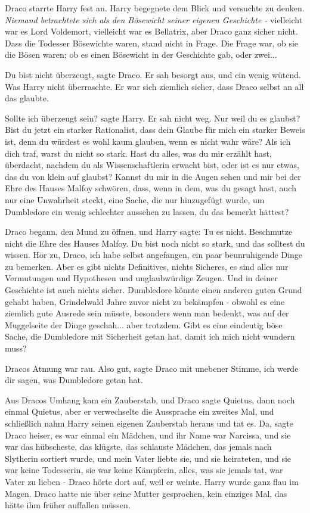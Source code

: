 Draco starrte Harry fest an. Harry begegnete dem Blick und versuchte zu denken.
\emph{Niemand betrachtete sich als den Bösewicht seiner eigenen Geschichte -}
vielleicht war es Lord Voldemort, vielleicht war es Bellatrix, aber Draco ganz
sicher nicht. Dass die Todesser Bösewichte waren, stand nicht in Frage. Die
Frage war, ob sie die Bösen waren; ob es einen Bösewicht in der Geschichte gab,
oder zwei...

\glqq{}Du bist nicht überzeugt\grqq{}, sagte Draco. Er sah besorgt aus, und ein
wenig wütend. Was Harry nicht überraschte. Er war sich ziemlich sicher, dass
Draco selbst an all das glaubte.

\glqq{}Sollte ich überzeugt sein?\grqq{} sagte Harry. Er sah nicht weg. \glqq{}Nur
weil du es glaubst? Bist du jetzt ein starker Rationalist, dass dein Glaube für
mich ein starker Beweis ist, denn du würdest es wohl kaum glauben, wenn es nicht
wahr wäre? Als ich dich traf, warst du nicht so stark. Hast du alles, was du mir
erzählt hast, überdacht, nachdem du als Wissenschaftlerin erwacht bist, oder ist
es nur etwas, das du von klein auf glaubst? Kannst du mir in die Augen sehen und
mir bei der Ehre des Hauses Malfoy schwören, dass, wenn in dem, was du gesagt
hast, auch nur eine Unwahrheit steckt, eine Sache, die nur hinzugefügt wurde, um
Dumbledore ein wenig schlechter aussehen zu lassen, du das bemerkt
hättest?\grqq{}

Draco begann, den Mund zu öffnen, und Harry sagte: \glqq{}Tu es nicht. Beschmutze
nicht die Ehre des Hauses Malfoy. Du bist noch nicht so stark, und das solltest
du wissen. Hör zu, Draco, ich habe selbst angefangen, ein paar beunruhigende
Dinge zu bemerken. Aber es gibt nichts Definitives, nichts Sicheres, es sind
alles nur Vermutungen und Hypothesen und unglaubwürdige Zeugen. Und in deiner
Geschichte ist auch nichts sicher. Dumbledore könnte einen anderen guten Grund
gehabt haben, Grindelwald Jahre zuvor nicht zu bekämpfen - obwohl es eine
ziemlich gute Ausrede sein müsste, besonders wenn man bedenkt, was auf der
Muggelseite der Dinge geschah... aber trotzdem. Gibt es eine eindeutig böse
Sache, die Dumbledore mit Sicherheit getan hat, damit ich mich nicht wundern
muss?\grqq{}

Dracos Atmung war rau. \glqq{}Also gut\grqq{}, sagte Draco mit unebener Stimme,
\glqq{}ich werde dir sagen, was Dumbledore getan hat.\grqq{}

Aus Dracos Umhang kam ein Zauberstab, und Draco sagte \glqq{}Quietus\grqq{}, dann
noch einmal \glqq{}Quietus\grqq{}, aber er verwechselte die Aussprache ein
zweites Mal, und schließlich nahm Harry seinen eigenen Zauberstab heraus und tat
es. \glqq{}Da\grqq{}, sagte Draco heiser, \glqq{}es war einmal ein Mädchen, und
ihr Name war Narcissa, und sie war das hübscheste, das klügste, das schlauste
Mädchen, das jemals nach Slytherin sortiert wurde, und mein Vater liebte sie,
und sie heirateten, und sie war keine Todesserin, sie war keine Kämpferin,
alles, was sie jemals tat, war Vater zu lieben -\grqq{} Draco hörte dort auf,
weil er weinte. Harry wurde ganz flau im Magen. Draco hatte nie über seine
Mutter gesprochen, kein einziges Mal, das hätte ihm früher auffallen müssen.

